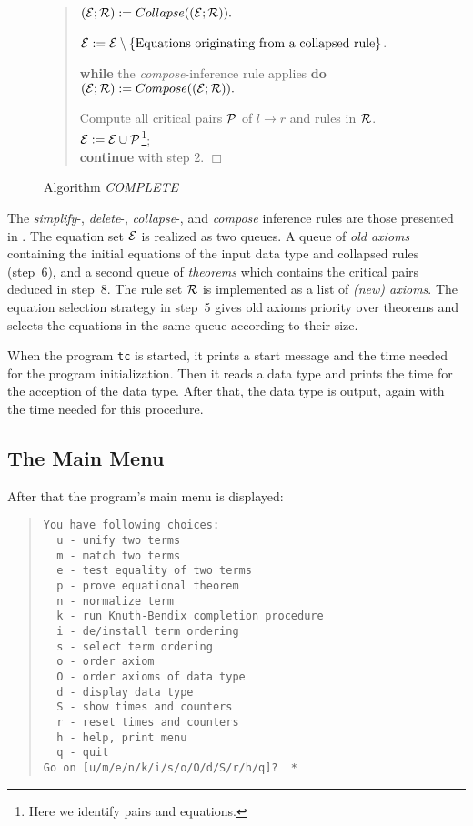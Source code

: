\begin{figure}[ht]
\begin{center}
{\begin{minipage}{5.5in}
\begin{quote}
\begin{description}
    \( ({\cal E};{\cal R}) := Collapse(({\cal E};{\cal R})). \)
 \item[{(6') [Subconnectedness criterion.]}]
    \( {\cal E} := {\cal E} \setminus \{ \mbox{Equations originating from a
    collapsed rule} \} \).
 \item[{(7) [Compose.]}] {\bf while} the {\em compose}-inference rule
   applies {\bf do} \\
   \( ({\cal E};{\cal R}) := Compose(({\cal E};{\cal R})). \)
 \item[{(8) [Deduce.]}] Compute all critical pairs ${\cal P}$ of
    $l \rightarrow r$ and rules
    in $\cal R$. \( {\cal E} := {\cal E} \cup {\cal P} \)\footnote{Here we
                                             identify pairs and equations.};
    \\ {\bf continue} with step 2. \hfill $\Box$
\end{description}
\end{quote}
\end{minipage}
}
\end{center}
\caption{Algorithm {\em COMPLETE}} \label{fi:cmpl}
\end{figure}
The {\em simplify}-, {\em delete}-, {\em collapse}-, and {\em compose}
inference rules are those presented in \cite{Dershowitz:89}.
The equation set $\cal E$ is realized as two queues.
A queue of {\em old axioms} containing the initial equations of the 
input data type and collapsed rules (step~6), and a second queue of 
{\em theorems} which contains the critical pairs deduced in step~8.
The rule set $\cal R$ is implemented as a list of {\em (new) axioms}.
The equation selection strategy in step~5 gives old axioms priority 
over theorems and selects the equations in the same queue according to
their size.

When the program {\tt tc} is started, it prints a start message and 
the time needed for the program initialization.
Then it reads a data type and prints the time 
for the acception of the data type. After that, the data type is output,
again with the time needed for this procedure.

\subsection{The Main Menu}
After that the program's main menu is displayed:
\begin{quote}
\begin{verbatim}
You have following choices: 
  u - unify two terms 
  m - match two terms 
  e - test equality of two terms 
  p - prove equational theorem
  n - normalize term 
  k - run Knuth-Bendix completion procedure
  i - de/install term ordering
  s - select term ordering
  o - order axiom
  O - order axioms of data type
  d - display data type
  S - show times and counters
  r - reset times and counters
  h - help, print menu
  q - quit
Go on [u/m/e/n/k/i/s/o/O/d/S/r/h/q]?  *
\end{verbatim}
\end{quote}

